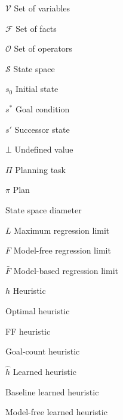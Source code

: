 \begin{listofsymbols}{\hgc}
    \item[$\mathcal{V}$] Set of variables
    \item[$\mathcal{F}$] Set of facts
    \item[$\mathcal{O}$] Set of operators
    \item[$\mathcal{S}$] State space
    \item[$s_0$] Initial state
    \item[$s^*$] Goal condition
    \item[$s'$] Successor state
    \item[$\bot$] Undefined value
    \item[$\Pi$] Planning task
    \item[$\pi$] Plan
    \item[\distfarthest] State space diameter
    \item[$L$] Maximum regression limit
    \item[$F$] Model-free regression limit
    \item[$\bar F$] Model-based regression limit
    \item[$h$] Heuristic
    \item[\hstar] Optimal heuristic
    \item[\hff] FF heuristic
    \item[\hgc] Goal-count heuristic
    \item[$\hat h$] Learned heuristic
    \item[\hnnbase] Baseline learned heuristic
    \item[\hnnnomutex] Model-free learned heuristic
\end{listofsymbols}

